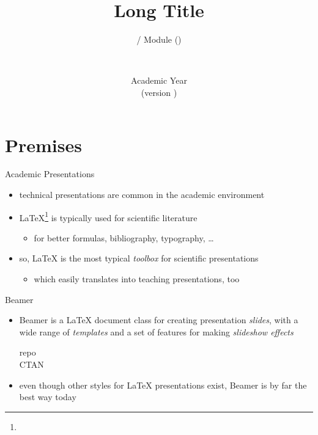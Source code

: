 \documentclass[presentation]{beamer}\mode<presentation>{\usetheme{AMSBolognaFC}}
\title[\currentLab{} -- Short Title]{
	Long Title
}
\subtitle{\courseName{} / Module \moduleN{} (\courseAcronym)}
\author[\sspeaker{\gcShort}]{\speaker{\gcFull} \\ \gcEmail}
\institute[\disiShort, \uniboShort]{\disi{} (\disiShort)\\\unibo}
\date[A.Y. \academicYear{} (v.\ \version)]{Academic Year \academicYear{}\\(version \version)}
\begin{document}

\frame{\titlepage}

%

\section{Premises}

\begin{frame}[c]{Academic Presentations}
%
\begin{itemize}
	\item technical presentations are common in the academic environment
	\item \alert{\LaTeX{}}\footnote{} is typically used for scientific literature
	\begin{itemize}
		\item for better formulas, bibliography, typography, \ldots
	\end{itemize}
	\item so, \LaTeX{} is the most typical \emph{toolbox} for scientific presentations
	\begin{itemize}
		\item which easily translates into teaching presentations, too
	\end{itemize}
\end{itemize}
%
\end{frame}

\begin{frame}[c]{Beamer}
%
\begin{itemize}
	\item \alert{Beamer} is a \LaTeX{} document class for creating presentation \emph{slides}, with a wide range of \emph{templates} and a set of features for making \emph{slideshow effects}
	\begin{description}
		\item[repo] 
		\item[CTAN] 
	\end{description}
	\item even though other styles for \LaTeX{} presentations exist, Beamer is by far the best way today
\end{itemize}
%
\end{frame}
\end{document}
